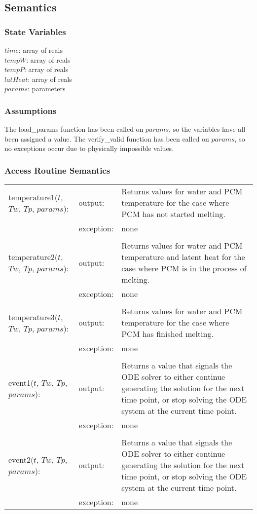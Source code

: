 \documentclass[12pt]{article}
\begin{document}
\subsection{Semantics}
\subsubsection{State Variables}
$time$: array of reals \\
$tempW$: array of reals \\
$tempP$: array of reals \\
$latHeat$: array of reals \\
$params$: parameters
\subsubsection{Assumptions}
The load\_params function has been called on $params$, so the variables have all been assigned a value. The verify\_valid function has been called on $params$, so no exceptions occur due to physically impossible values. 
\subsubsection{Access Routine Semantics}
\begin{center}
\begin{tabular}{l l p{8cm}}
temperature1($t$, $Tw$, $Tp$, $params$): & output: & Returns values for water and PCM temperature for the case where PCM has not started melting. \\
& exception: & none \\ \\
temperature2($t$, $Tw$, $Tp$, $params$): & output: & Returns values for water and PCM temperature and latent heat for the case where PCM is in the process of melting. \\
& exception: & none \\ \\
temperature3($t$, $Tw$, $Tp$, $params$): & output: & Returns values for water and PCM temperature for the case where PCM has finished melting. \\ 
& exception: & none \\ \\
event1($t$, $Tw$, $Tp$, $params$): & output: & Returns a value that signals the ODE solver to either continue generating the solution for the next time point, or stop solving the ODE system at the current time point. \\ 
& exception: & none \\ \\
event2($t$, $Tw$, $Tp$, $params$): & output: & Returns a value that signals the ODE solver to either continue generating the solution for the next time point, or stop solving the ODE system at the current time point. \\
& exception: & none \\
\end{tabular}
\end{center}
\end{document}
